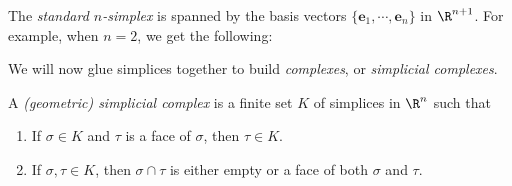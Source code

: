 \documentclass[a4paper]{article}
\begin{document}
\begin{eg}
  The \emph{standard $n$-simplex} is spanned by the basis vectors $\{\mathbf{e}_1, \cdots, \mathbf{e}_n\}$ in $\R^{n + 1}$. For example, when $n = 2$, we get the following:
  \begin{center}
  \end{center}
\end{eg}

We will now glue simplices together to build \emph{complexes}, or \emph{simplicial complexes}.

\begin{defi}[]
  A \emph{(geometric) simplicial complex} is a finite set $K$ of simplices in $\R^n$ such that
  \begin{enumerate}
    \item If $\sigma \in K$ and $\tau$ is a face of $\sigma$, then $\tau \in K$.
    \item If $\sigma, \tau \in K$, then $\sigma \cap \tau$ is either empty or a face of both $\sigma$ and $\tau$.
  \end{enumerate}
\end{defi}
\end{document}
